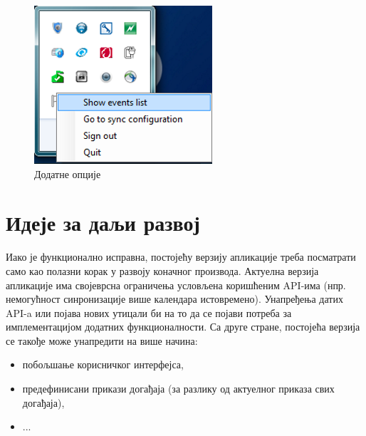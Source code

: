 \begin{figure}[H]
	\centering
	\includegraphics[scale=0.5]{slike/IconRightClick.png}
	\caption{Додатне опције}
	\label{fig:icon_right_click}
\end{figure}

\section{Идеје за даљи развој}

Иако је функционално исправна, постојећу верзију апликације треба посматрати само као полазни корак у развоју коначног производа. Актуелна верзија апликације има својеврсна ограничења условљена коришћеним API-има (нпр. немогућност синронизације више календара истовремено). Унапређења датих API-a или појава нових утицали би на то да се појави потреба за имплементацијом додатних функционалности. Са друге стране, постојећа верзија се такође може унапредити на више начина:
\begin{itemize}
	\item{побољшање корисничког интерфејса},
	\item{предефинисани прикази догађаја (за разлику од актуелног приказа свих догађаја)},
	\item{...}
\end{itemize}